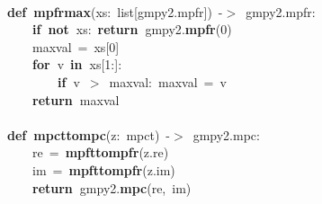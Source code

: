 \documentclass{article}\usepackage[]{graphicx}\usepackage[dvipsnames,table]{xcolor}
\makeatletter
\newcommand{\hlnum}[1]{\textcolor[rgb]{0.686,0.059,0.569}{#1}}%
\newcommand{\hlopt}[1]{\textcolor[rgb]{0,0,0}{#1}}%
\newcommand{\hldef}[1]{\textcolor[rgb]{0.345,0.345,0.345}{#1}}%
\newcommand{\hlkwa}[1]{\textcolor[rgb]{0.161,0.373,0.58}{\textbf{#1}}}%
\newcommand{\hlkwb}[1]{\textcolor[rgb]{0.69,0.353,0.396}{#1}}%
\newcommand{\hlkwd}[1]{\textcolor[rgb]{0.737,0.353,0.396}{\textbf{#1}}}%
\newenvironment{kframe}{%
 \def\at@end@of@kframe{}%
 \ifinner\ifhmode%
  \def\at@end@of@kframe{\end{minipage}}%
  \begin{minipage}{\columnwidth}%
 \fi\fi%
 \def\FrameCommand##1{\hskip\@totalleftmargin \hskip-\fboxsep
 \colorbox{shadecolor}{##1}\hskip-\fboxsep
     \hskip-\linewidth \hskip-\@totalleftmargin \hskip\columnwidth}%
 \MakeFramed {\advance\hsize-\width
   \@totalleftmargin\z@ \linewidth\hsize
   \@setminipage}}%
 {\par\unskip\endMakeFramed%
 \at@end@of@kframe}
\newenvironment{knitrout}{}{} %
\makeatother
\begin{document}
\begin{center}
\begin{minipage}[m]{15cm}
\begin{knitrout}
\begin{kframe}
\hldef{}\hspace*{\fill}\\
\hldef{}\hlkwa{def\ }\hldef{}\hlkwd{mpfr\textunderscore max}\hldef{}\hlopt{(}\hldef{xs}\hlopt{:\ }\hldef{}\hlkwb{list}\hldef{}\hlopt{{[}}\hldef{gmpy2}\hlopt{.}\hldef{mpfr}\hlopt{{]})\ {-}$>$\ }\hldef{gmpy2}\hlopt{.}\hldef{mpfr}\hlopt{:}\hspace*{\fill}\\
\hldef{}\hldef{\ \ \ \ }\hldef{}\hlkwa{if\ not\ }\hldef{xs}\hlopt{:\ }\hldef{}\hlkwa{return\ }\hldef{gmpy2}\hlopt{.}\hldef{}\hlkwd{mpfr}\hldef{}\hlopt{(}\hldef{}\hlnum{0}\hldef{}\hlopt{)}\hspace*{\fill}\\
\hldef{}\hldef{\ \ \ \ }\hldef{max\textunderscore val\ }\hlopt{=\ }\hldef{xs}\hlopt{{[}}\hldef{}\hlnum{0}\hldef{}\hlopt{{]}}\hspace*{\fill}\\
\hldef{}\hldef{\ \ \ \ }\hldef{}\hlkwa{for\ }\hldef{v\ }\hlkwa{in\ }\hldef{xs}\hlopt{{[}}\hldef{}\hlnum{1}\hldef{}\hlopt{:{]}:}\hspace*{\fill}\\
\hldef{}\hldef{\ \ \ \ \ \ \ \ }\hldef{}\hlkwa{if\ }\hldef{v\ }\hlopt{$>$\ }\hldef{max\textunderscore val}\hlopt{:\ }\hldef{max\textunderscore val\ }\hlopt{=\ }\hldef{v}\hspace*{\fill}\\
\hldef{}\hldef{\ \ \ \ }\hldef{}\hlkwa{return\ }\hldef{max\textunderscore val}\hspace*{\fill}\\
\hldef{}\hspace*{\fill}\\
\hldef{}\hlkwa{def\ }\hldef{}\hlkwd{mpc\textunderscore t\textunderscore to\textunderscore mpc}\hldef{}\hlopt{(}\hldef{z}\hlopt{:\ }\hldef{mpc\textunderscore t}\hlopt{)\ {-}$>$\ }\hldef{gmpy2}\hlopt{.}\hldef{mpc}\hlopt{:\ }\hldef{}\hspace*{\fill}\\
\hldef{}\hldef{\ \ \ \ }\hldef{re\ }\hlopt{=\ }\hldef{}\hlkwd{mpf\textunderscore t\textunderscore to\textunderscore mpfr}\hldef{}\hlopt{(}\hldef{z}\hlopt{.}\hldef{re}\hlopt{)}\hspace*{\fill}\\
\hldef{}\hldef{\ \ \ \ }\hldef{im\ }\hlopt{=\ }\hldef{}\hlkwd{mpf\textunderscore t\textunderscore to\textunderscore mpfr}\hldef{}\hlopt{(}\hldef{z}\hlopt{.}\hldef{im}\hlopt{)}\hspace*{\fill}\\
\hldef{}\hldef{\ \ \ \ }\hldef{}\hlkwa{return\ }\hldef{gmpy2}\hlopt{.}\hldef{}\hlkwd{mpc}\hldef{}\hlopt{(}\hldef{re}\hlopt{,\ }\hldef{im}\hlopt{)}\hldef{}\hspace*{\fill}
\mbox{}
\normalfont
\end{kframe}
\end{knitrout}
\end{minipage}
\end{center}
\end{document}
